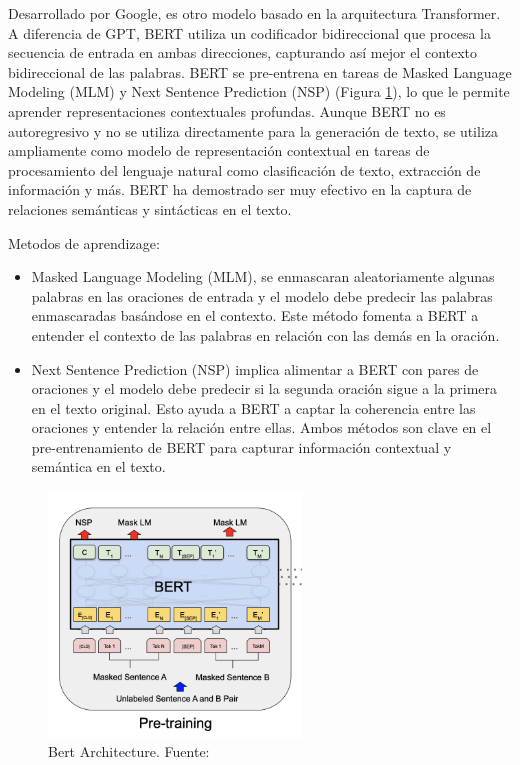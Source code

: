     Desarrollado por Google, es otro modelo basado en la arquitectura Transformer. A diferencia de GPT, BERT utiliza un codificador bidireccional que procesa la secuencia de entrada en ambas direcciones, capturando así mejor el contexto bidireccional de las palabras. BERT se pre-entrena en tareas de Masked Language Modeling (MLM) y Next Sentence Prediction (NSP) (Figura \ref{fig:bert}), lo que le permite aprender representaciones contextuales profundas. Aunque BERT no es autoregresivo y no se utiliza directamente para la generación de texto, se utiliza ampliamente como modelo de representación contextual en tareas de procesamiento del lenguaje natural como clasificación de texto, extracción de información y más. BERT ha demostrado ser muy efectivo en la captura de relaciones semánticas y sintácticas en el texto.\cite{devlin2019bert}

    Metodos de aprendizage:
    \begin{itemize}
        \item Masked Language Modeling (MLM), se enmascaran aleatoriamente algunas palabras en las oraciones de entrada y el modelo debe predecir las palabras enmascaradas basándose en el contexto. Este método fomenta a BERT a entender el contexto de las palabras en relación con las demás en la oración.   
        \item Next Sentence Prediction (NSP) implica alimentar a BERT con pares de oraciones y el modelo debe predecir si la segunda oración sigue a la primera en el texto original. Esto ayuda a BERT a captar la coherencia entre las oraciones y entender la relación entre ellas. Ambos métodos son clave en el pre-entrenamiento de BERT para capturar información contextual y semántica en el texto.
    \end{itemize}
    \begin{figure}[h]
        \centering
        \includegraphics[width=0.6\textwidth]{plantilla-libro/img/bert_architecture.png}
        \caption{Bert Architecture. Fuente: \cite{devlin2019bert}}
        \label{fig:bert}
    \end{figure}
\newpage

